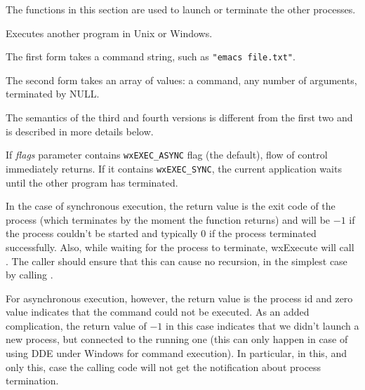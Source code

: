 The functions in this section are used to launch or terminate the other
processes.

\label{wxexecute}







Executes another program in Unix or Windows.

The first form takes a command string, such as {\tt "emacs file.txt"}.

The second form takes an array of values: a command, any number of
arguments, terminated by NULL.

The semantics of the third and fourth versions is different from the first two
and is described in more details below.

If {\it flags} parameter contains {\tt wxEXEC\_ASYNC} flag (the default), flow
of control immediately returns. If it contains {\tt wxEXEC\_SYNC}, the current
application waits until the other program has terminated.

In the case of synchronous execution, the return value is the exit code of
the process (which terminates by the moment the function returns) and will be
$-1$ if the process couldn't be started and typically 0 if the process
terminated successfully. Also, while waiting for the process to
terminate, wxExecute will call . The caller
should ensure that this can cause no recursion, in the simplest case by
calling .

For asynchronous execution, however, the return value is the process id and
zero value indicates that the command could not be executed. As an added
complication, the return value of $-1$ in this case indicates that we didn't
launch a new process, but connected to the running one (this can only happen in
case of using DDE under Windows for command execution). In particular, in this,
and only this, case the calling code will not get the notification about
process termination.

